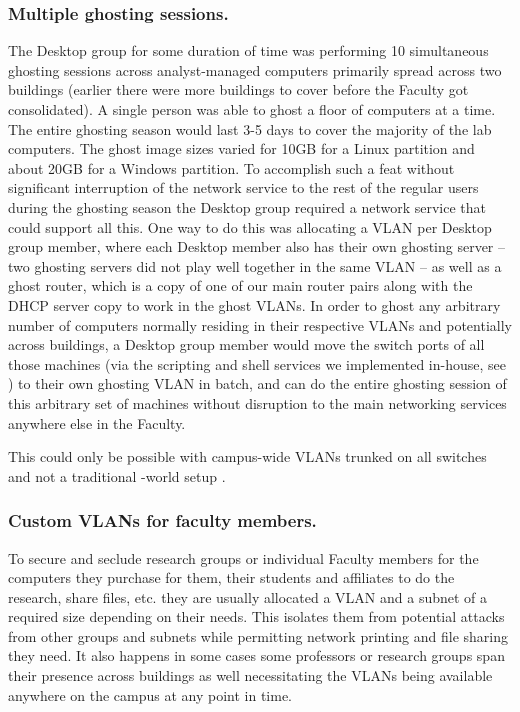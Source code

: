 \subsubsection{Multiple ghosting sessions.}
\label{sect:mult-ghosting-sessions}

The Desktop group for some duration of time was performing 10 simultaneous
ghosting sessions across  analyst-managed computers primarily
spread across two buildings (earlier there were more buildings to cover before
the Faculty got consolidated). A single person was able to ghost a floor of
 computers at a time. The entire ghosting season would last 3-5 days
to cover the majority of the lab computers. The ghost image sizes varied
for 10GB for a Linux partition and about 20GB for a Windows partition.
To accomplish such a feat without significant interruption of the network
service to the rest of the regular users during the ghosting season
the Desktop group required a network service that could support all this.
One way to do this was allocating a VLAN per Desktop group member, where
each Desktop member also has their own ghosting server -- two ghosting
servers did not play well together in the same VLAN -- as well
as a ghost router, which is a copy of one of our main router pairs
along with the DHCP server copy to work in the ghost VLANs. In order to
ghost any arbitrary number of computers normally residing in their respective
VLANs and potentially across buildings, a Desktop group member would move
the switch ports of all those machines (via the scripting and shell services
we implemented in-house, see ) to their own ghosting VLAN
in batch, and can do the entire ghosting session of this arbitrary set of
machines without disruption to the main networking services anywhere else
in the Faculty.

This could only be possible with campus-wide VLANs trunked on all switches
and not a traditional {\cisco}-world setup \cite{cisco-lan-switching-99,cisco-catalyst-2950-2003}.


\subsubsection{Custom VLANs for faculty members.}
\label{sect:vlans-faculty}

To secure and seclude research groups or individual Faculty members for the
computers they purchase for them, their students and affiliates to do
the research, share files, etc. they are usually allocated a VLAN and a subnet
of a required size depending on their needs.
This isolates them from potential attacks from other groups and subnets
while permitting
network printing
and file sharing they need. It also happens
in some cases some professors or research groups span their presence across
buildings as well necessitating the VLANs being available anywhere on the
campus at any point in time.


